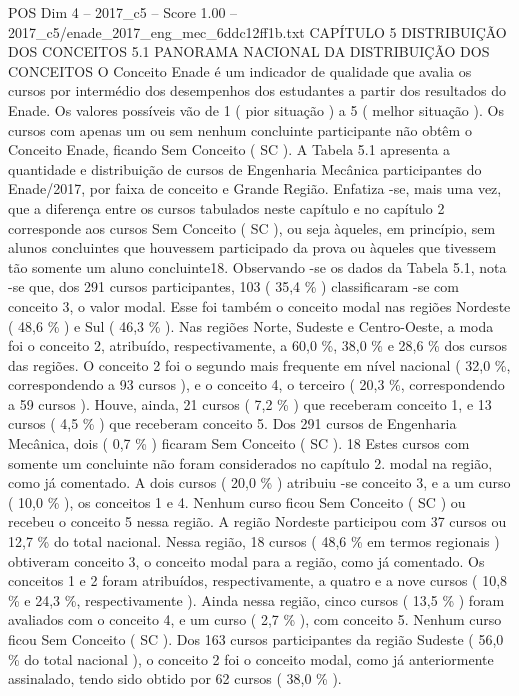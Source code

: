 \begin{textsample}{POS Dim 4 – 2017\_c5 – Score 1.00 – 2017\_c5/enade\_2017\_eng\_mec\_6ddc12ff1b.txt}  \label{ex:f4_pos_228}
CAPÍTULO 5 DISTRIBUIÇÃO DOS CONCEITOS 5.1 PANORAMA NACIONAL DA DISTRIBUIÇÃO DOS CONCEITOS O Conceito Enade é um indicador de qualidade que avalia os cursos por intermédio dos desempenhos dos estudantes a partir dos resultados do Enade.
Os valores possíveis vão de 1 ( pior situação ) a 5 ( melhor situação ).
Os cursos com apenas um ou sem nenhum concluinte participante não obtêm o Conceito Enade, ficando Sem Conceito ( SC ).
A Tabela 5.1 apresenta a quantidade e distribuição de cursos de Engenharia Mecânica participantes do Enade/2017, por faixa de conceito e Grande Região.
Enfatiza -se, mais uma vez, que a diferença entre os cursos tabulados neste capítulo e no capítulo 2 corresponde aos cursos Sem Conceito ( SC ), ou seja àqueles, em princípio, sem alunos concluintes que houvessem participado da prova ou àqueles que tivessem tão somente um aluno concluinte18.
Observando -se os dados da Tabela 5.1, nota -se que, dos 291 cursos participantes, 103 ( 35,4 \% ) classificaram -se com conceito 3, o valor modal.
Esse foi também o conceito modal nas regiões Nordeste ( 48,6 \% ) e Sul ( 46,3 \% ).
Nas regiões Norte, Sudeste e Centro-Oeste, a moda foi o conceito 2, atribuído, respectivamente, a 60,0 \%, 38,0 \% e 28,6 \% dos cursos das regiões.
O conceito 2 foi o segundo mais frequente em nível nacional ( 32,0 \%, correspondendo a 93 cursos ), e o conceito 4, o terceiro ( 20,3 \%, correspondendo a 59 cursos ).
Houve, ainda, 21 cursos ( 7,2 \% ) que receberam conceito 1, e 13 cursos ( 4,5 \% ) que receberam conceito 5.
Dos 291 cursos de Engenharia Mecânica, dois ( 0,7 \% ) ficaram Sem Conceito ( SC ). 18 Estes cursos com somente um concluinte não foram considerados no capítulo 2. modal na região, como já comentado.
A dois cursos ( 20,0 \% ) atribuiu -se conceito 3, e a um curso ( 10,0 \% ), os conceitos 1 e 4.
Nenhum curso ficou Sem Conceito ( SC ) ou recebeu o conceito 5 nessa região.
A região Nordeste participou com 37 cursos ou 12,7 \% do total nacional.
Nessa região, 18 cursos ( 48,6 \% em termos regionais ) obtiveram conceito 3, o conceito modal para a região, como já comentado.
Os conceitos 1 e 2 foram atribuídos, respectivamente, a quatro e a nove cursos ( 10,8 \% e 24,3 \%, respectivamente ).
Ainda nessa região, cinco cursos ( 13,5 \% ) foram avaliados com o conceito 4, e um curso ( 2,7 \% ), com conceito 5.
Nenhum curso ficou Sem Conceito ( SC ).
Dos 163 cursos participantes da região Sudeste ( 56,0 \% do total nacional ), o conceito 2 foi o conceito modal, como já anteriormente assinalado, tendo sido obtido por 62 cursos ( 38,0 \% ).

\end{textsample}
